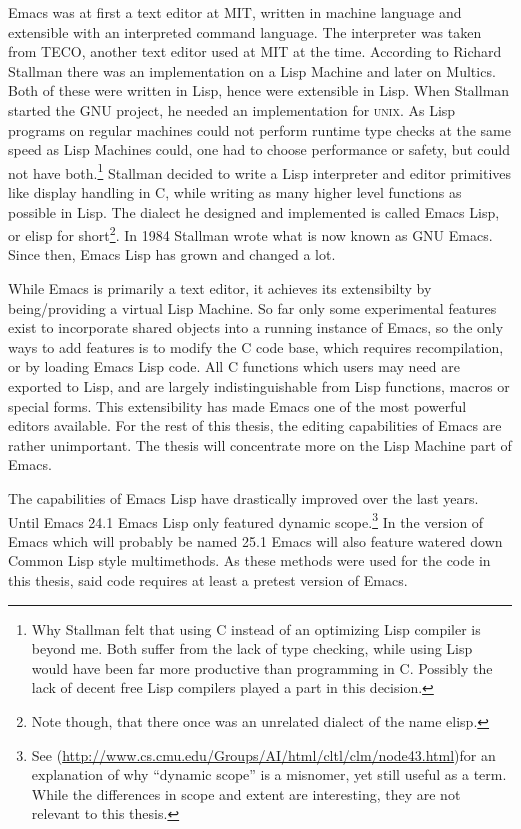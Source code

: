 \documentclass[a4paper,10pt,twoside]{report}
\newcommand{\el}{Emacs Lisp}
\newcommand{\cl}{Common Lisp}
\newcommand{\unix}{\textsc{unix}}
\begin{document}
Emacs was at first a text editor at MIT, written in machine language and
extensible with an interpreted command language.  The interpreter was taken from
TECO, another text editor used at MIT at the time.  According to Richard
Stallman \cite{emacs-hist} there was an implementation on a Lisp Machine and
later on Multics.  Both of these were written in Lisp, hence were extensible in
Lisp.  When Stallman started the GNU project, he needed an implementation for
\unix{}.  As Lisp programs on regular machines could not perform runtime type
checks at the same speed as Lisp Machines could, one had to choose performance
or safety, but could not have both.\footnote{Why Stallman felt that using C
  instead of an optimizing Lisp compiler is beyond me.  Both suffer from the
  lack of type checking, while using Lisp would have been far more productive
  than programming in C.  Possibly the lack of decent free Lisp compilers played
  a part in this decision.} Stallman decided to write a Lisp interpreter and
editor primitives like display handling in C, while writing as many higher level
functions as possible in Lisp.  The dialect he designed and implemented is
called \el{}, or elisp for short\footnote{Note though, that there once was an
  unrelated dialect of the name elisp.}.  In 1984 Stallman wrote what is now
known as GNU Emacs\cite{emacs-first-release}. Since then, \el{} has grown and
changed a lot.

While Emacs is primarily a text editor, it achieves its extensibilty by
being/providing a virtual Lisp Machine.  So far only some experimental features
exist to incorporate shared objects into a running instance of Emacs, so the
only ways to add features is to modify the C code base, which requires
recompilation, or by loading \el{} code.  All C functions which users may need
are exported to Lisp, and are largely indistinguishable from Lisp functions,
macros or special forms.  This extensibility has made Emacs one of the most
powerful editors available.  For the rest of this thesis, the editing
capabilities of Emacs are rather unimportant.  The thesis will concentrate more
on the Lisp Machine part of Emacs.

The capabilities of \el{} have drastically improved over the last years.  Until
Emacs 24.1 \el{} only featured dynamic scope\cite{Emacs-Lexical}.\footnote{See
  \cite{CLTL2}
  (\url{http://www.cs.cmu.edu/Groups/AI/html/cltl/clm/node43.html})for an
  explanation of why ``dynamic scope'' is a misnomer, yet still useful as a
  term.  While the differences in scope and extent are interesting, they are not
  relevant to this thesis.}  In the version of Emacs which will probably be
named 25.1 Emacs will also feature watered down \cl{} style multimethods.  As
these methods were used for the code in this thesis, said code requires at least
a pretest version of Emacs\cite{emacs-pretest}.
\end{document}
